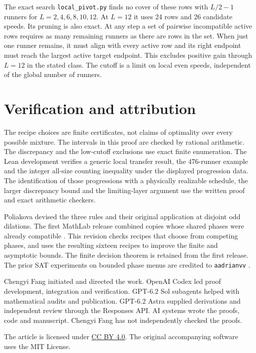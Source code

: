 \documentclass[11pt]{article}
\theoremstyle{definition}
\begin{document}
The exact search \texttt{local\_pivot.py} finds no cover of these rows
with \(L/2-1\) runners for \(L=2,4,6,8,10,12\). At \(L=12\) it
uses 24 rows and 26 candidate speeds. Its pruning is also exact.
At any step a set of pairwise incompatible active rows requires as
many remaining runners as there are rows in the set. When just
one runner remains, it must align with every active row and its
right endpoint must reach the largest active target endpoint.
This excludes positive gain through \(L=12\) in the stated class.
The cutoff is a limit on local even speeds, independent of the
global number of runners.

\section*{Verification and attribution}

The recipe choices are finite certificates, not claims of optimality
over every possible mixture. The intervals in this proof are checked
by rational arithmetic. The discrepancy and the low-cutoff
exclusions use exact finite enumeration.
The Lean development verifies a generic local transfer result,
the 476-runner example and the integer all-size counting inequality
under the displayed progression data. The identification of
those progressions with a physically realizable schedule, the larger
discrepancy bound and the limiting-layer argument use the written proof
and exact arithmetic checkers.

Poliakova devised the three rules and their original application at
disjoint odd dilations. The first MathLab release combined copies
whose shared phases were already compatible \cite{MathLabVOne}. This
revision checks recipes that choose from competing phases, and uses
the resulting sixteen recipes to improve the finite and asymptotic
bounds. The finite decision theorem is retained from the first release.
The prior SAT experiments on bounded phase menus are credited to
\texttt{aadrianvv} \cite{UpstreamSearch}.

\enlargethispage{2\baselineskip}
Chengyi Fang initiated and directed the work. OpenAI Codex led proof
development, integration and verification. GPT-6.2 Sol subagents helped with
mathematical audits and publication. GPT-6.2 Astra supplied derivations and
independent review through the Responses API. AI systems wrote the proofs,
code and manuscript. Chengyi Fang has not independently checked the proofs.

The article is licensed under
\href{https://creativecommons.org/licenses/by/4.0/}{CC BY 4.0}.
The original accompanying software uses the MIT License.
\end{document}
